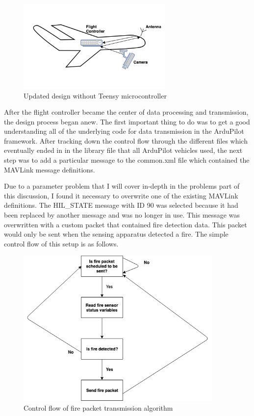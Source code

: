 \documentclass[12pt,journal,compsoc]{IEEEtran}
\begin{document}
\begin{figure}[h!]
\hspace*{0cm}
\centering
\includegraphics[width=3in]{Version2.png}
\caption{Updated design without Teensy microcontroller}
\label{version2}
\end{figure}

After the flight controller became the center of data processing and transmission, the design process began anew. The first important thing to do was to get a good understanding all of the underlying code for data transmission in the ArduPilot framework. After tracking down the control flow through the different files which eventually ended in in the library file that all ArduPilot vehicles used, the next step was to add a particular message to the common.xml file which contained the MAVLink message definitions. 

Due to a parameter problem that I will cover in-depth in the problems part of this discussion, I found it necessary to overwrite one of the existing MAVLink definitions. The HIL\_STATE message with ID 90  was selected because it had been replaced by another message and was no longer in use. This message was overwritten with a custom packet that contained fire detection data. This packet would only be sent when the sensing apparatus detected a fire. The simple control flow of this setup is as follows.
\begin{figure}[h!]
\hspace*{0cm}
\centering
\includegraphics[width=4in]{Sending.png}
\caption{Control flow of fire packet transmission algorithm}
\label{sending}
\end{figure}
\end{document}
